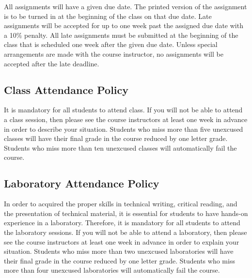 All assignments will have a given due date. The printed version of the
assignment is to be turned in at the beginning of the class on that due
date. Late assignments will be accepted for up to one week past the
assigned due date with a 10\% penalty. All late assignments must be
submitted at the beginning of the class that is scheduled one week after
the given due date. Unless special arrangements are made with the course
instructor, no assignments will be accepted after the late deadline.

\subsection*{Class Attendance Policy}

It is mandatory for all students to attend class. If you will not be
able to attend a class session, then please see the course instructors at
least one week in advance in order to describe your situation. Students
who miss more than five unexcused classes will have their final grade in
the course reduced by one letter grade. Students who miss more than ten
unexcused classes will automatically fail the course.

\subsection*{Laboratory Attendance Policy}

In order to acquired the proper skills in technical writing, critical
reading, and the presentation of technical material, it is essential
for students to have hands-on experience in a laboratory. Therefore,
it is mandatory for all students to attend the laboratory sessions. If
you will not be able to attend a laboratory, then please see the
course instructors at least one week in advance in order to explain
your situation. Students who miss more than two unexcused laboratories
will have their final grade in the course reduced by one letter grade.
Students who miss more than four unexcused laboratories will
automatically fail the course.

